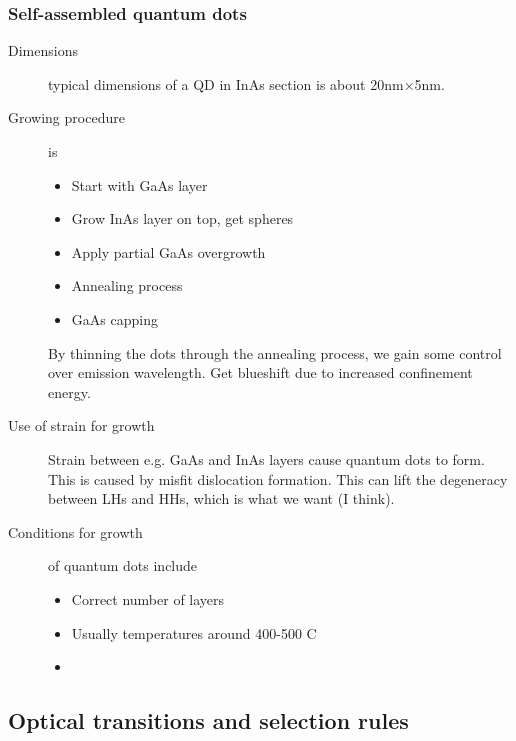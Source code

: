 \subsubsection{Self-assembled quantum dots}
\begin{description}
\item[Dimensions] typical dimensions of a QD in InAs section is about 20nm$\times$5nm. 

\item[Growing procedure] is
\begin{itemize}
\item Start with GaAs layer
\item Grow InAs layer on top, get spheres
\item Apply partial GaAs overgrowth
\item Annealing process
\item GaAs capping
\end{itemize}
By thinning the dots through the annealing process, we gain some control over emission wavelength. Get blueshift due to increased confinement energy. 

\item[Use of strain for growth] Strain between e.g. GaAs and InAs layers cause quantum dots to form. This is caused by misfit dislocation formation. This can lift the degeneracy between LHs and HHs, which is what we want (I think). 


\item[Conditions for growth] of quantum dots include
\begin{itemize}
\item Correct number of layers
\item Usually temperatures around 400-500 C
\item 
\end{itemize}

\end{description}
\subsection{Optical transitions and selection rules}
